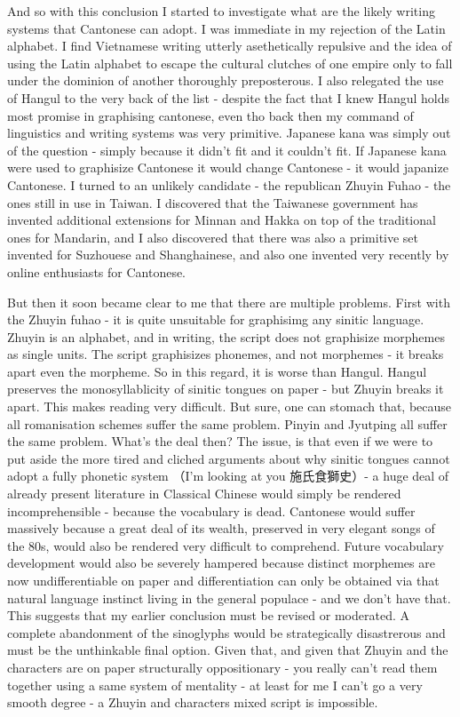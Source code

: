 And so with this conclusion I started to investigate what are the likely writing systems that Cantonese can adopt. I was immediate in my rejection of the Latin alphabet. I find Vietnamese writing utterly asethetically repulsive and the idea of using the Latin alphabet to escape the cultural clutches of one empire only to fall under the dominion of another thoroughly preposterous. I also relegated the use of Hangul to the very back of the list - despite the fact that I knew Hangul holds most promise in graphising cantonese, even tho back then my command of linguistics and writing systems was very primitive. Japanese kana was simply out of the question - simply because it didn't fit and it couldn't fit. If Japanese kana were used to graphisize Cantonese it would change Cantonese - it would japanize Cantonese. I turned to an unlikely candidate - the republican Zhuyin Fuhao - the ones still in use in Taiwan. I discovered that the Taiwanese government has invented additional extensions for Minnan and Hakka on top of the traditional ones for Mandarin, and I also discovered that there was also a primitive set invented for Suzhouese and Shanghainese, and also one invented very recently by online enthusiasts for Cantonese.

But then it soon became clear to me that there are multiple problems. First with the Zhuyin fuhao - it is quite unsuitable for graphisimg any sinitic language. Zhuyin is an alphabet, and in writing, the script does not graphisize morphemes as single units. The script graphisizes phonemes, and not morphemes - it breaks apart even the morpheme. So in this regard, it is worse than Hangul. Hangul preserves the monosyllablicity of sinitic tongues on paper - but Zhuyin breaks it apart. This makes reading very difficult. But sure, one can stomach that, because all romanisation schemes suffer the same problem. Pinyin and Jyutping all suffer the same problem. What's the deal then? The issue, is that even if we were to put aside the more tired and cliched arguments about why sinitic tongues cannot adopt a fully phonetic system （I'm looking at you 施氏食獅史）-  a huge deal of already present literature in Classical Chinese would simply be rendered incomprehensible - because the vocabulary is dead. Cantonese would suffer massively because a great deal of its wealth, preserved in very elegant songs of the 80s, would also be rendered very difficult to comprehend. Future vocabulary development would also be severely hampered because distinct morphemes are now undifferentiable on paper and differentiation can only be obtained via that natural language instinct living in the general populace - and we don't have that. This suggests that my earlier conclusion must be revised or moderated. A complete abandonment of the sinoglyphs would be strategically disastrerous and must be the unthinkable final option. Given that, and given that Zhuyin and the characters are on paper structurally oppositionary - you really can't read them together using a same system of mentality - at least for me I can't go a very smooth degree - a Zhuyin and characters mixed script is impossible.


